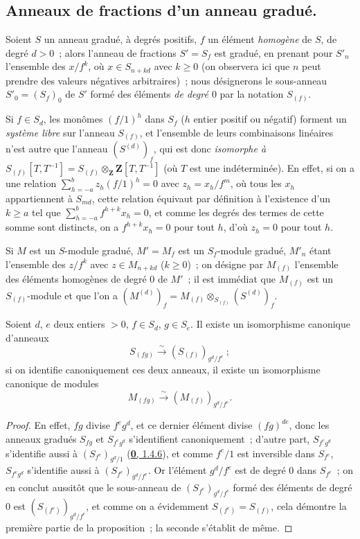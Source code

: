 \subsection{Anneaux de fractions d'un anneau gradué.}
\label{subsection:II.2.2-fr}

\begin{env}[2.2.1]
\label{II.2.2.1-fr}
Soient $S$ un anneau gradué, à degrés positifs, $f$ un élément
\emph{homogène} de $S$, de degré $d>0$~; alors l'anneau de fractions
$S'=S_f$ est gradué, en prenant pour $S'_n$ l'ensemble des $x/f^k$, où
$x\in S_{n+kd}$ avec $k\geq 0$ (on observera ici que $n$ peut prendre des
valeurs négatives arbitraires)~; nous désignerons le sous-anneau
$S'_0=(S_f)_0$ de $S'$ formé des éléments \emph{de degré $0$} par la
notation $S_{(f)}$.

Si $f\in S_d$, les monômes $(f/1)^h$ dans $S_f$ ($h$ entier positif ou
négatif) forment un \emph{système libre} sur l'anneau $S_{(f)}$, et
l'ensemble de leurs combinaisons linéaires n'est autre que
l'anneau $(S^{(d)})_f$, qui est donc \emph{isomorphe à
$S_{(f)}[T,T^{-1}]=S_{(f)}\otimes_{\mathbf{Z}}\mathbf{Z}[T,T^{-1}]$}
(où $T$ est une indéterminée). En effet, si on a une relation
$\sum_{h=-a}^{b}z_h(f/1)^h=0$ avec $z_h=x_h/f^m$, où tous les $x_h$
appartiennent à $S_{md}$, cette relation équivaut par définition à
l'existence d'un $k\geq a$ tel que
$\sum_{h=-a}^{b}f^{h+k}x_h=0$, et comme les degrés des termes de cette somme
sont distincts, on a $f^{h+k}x_h=0$ pour tout $h$, d'où $z_h=0$ pour tout
$h$.

Si $M$ est un $S$-module gradué, $M'=M_f$ est un $S_f$-module gradué,
$M'_n$ étant l'ensemble des $z/f^k$ avec $z\in M_{n+kd}$ ($k\geq 0$)~; on
désigne par $M_{(f)}$ l'ensemble des éléments homogènes de degré $0$ de
$M'$~; il est immédiat que $M_{(f)}$ est un $S_{(f)}$-module et que l'on a
$(M^{(d)})_f=M_{(f)}\otimes_{S_{(f)}}(S^{(d)})_f$.
\end{env}

\begin{lemma}[2.2.2]
\label{II.2.2.2-fr}
Soient $d$, $e$ deux entiers $>0$, $f\in S_d$, $g\in S_e$. Il existe un
isomorphisme canonique d'anneaux
\[
  S_{(fg)}\xrightarrow{\sim}(S_{(f)})_{g^d/f^e}~;
\]
si on identifie canoniquement ces deux anneaux, il existe un isomorphisme
canonique de modules
\[
  M_{(fg)}\xrightarrow{\sim}(M_{(f)})_{g^d/f^e}.
\]
\end{lemma}

\begin{proof}
En effet, $fg$ divise $f^e g^d$, et ce dernier élément divise $(fg)^{de}$,
donc les anneaux gradués $S_{fg}$ et $S_{f^e g^d}$ s'identifient
canoniquement~; d'autre part, $S_{f^e g^d}$ s'identifie aussi à
$(S_{f^e})_{g^d/1}$ (\hyperref[0.1.4.6-fr]{\textbf{0}, 1.4.6}), et comme $f^e/1$ est
inversible dans $S_{f^e}$, $S_{f^e g^d}$ s'identifie aussi à
$(S_{f^e})_{g^d/f^e}$. Or l'élément $g^d/f^e$ est de degré $0$ dans
$S_{f^e}$~; on en conclut aussitôt que le sous-anneau de
$(S_{f^e})_{g^d/f^e}$ formé des éléments de degré $0$ est
$(S_{(f^e)})_{g^d/f^e}$, et comme on a évidemment
$S_{(f^e)}=S_{(f)}$, cela démontre la première partie de la proposition~;
la seconde s'établit de même.
\end{proof}

